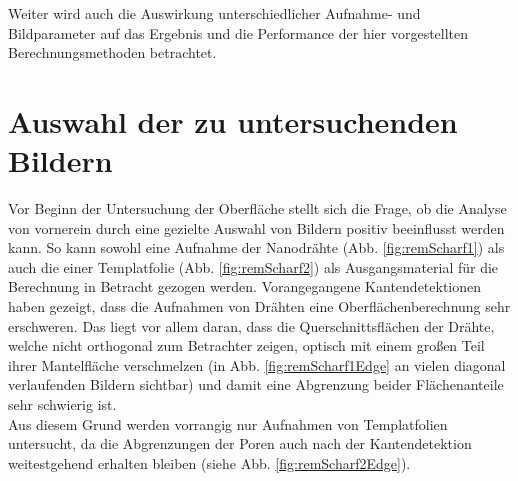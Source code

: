 \documentclass[accentcolor=tud1c, 11pt, toc=bib, toc=listof, captions=abovetable, parskip=half]{tudreport}
\begin{document}
Weiter wird auch die Auswirkung unterschiedlicher Aufnahme- und Bildparameter auf das Ergebnis und die Performance der hier vorgestellten Berechnungsmethoden betrachtet.

\section{Auswahl der zu untersuchenden Bildern}
Vor Beginn der Untersuchung der Oberfläche stellt sich die Frage, ob die Analyse von vornerein durch eine gezielte Auswahl von Bildern positiv beeinflusst werden kann. So kann sowohl eine Aufnahme der Nanodrähte (Abb. \ref{fig:remScharf1}) als auch die einer Templatfolie (Abb. \ref{fig:remScharf2}) als Ausgangsmaterial für die Berechnung in Betracht gezogen werden. Vorangegangene Kantendetektionen haben gezeigt, dass die Aufnahmen von Drähten eine Oberflächenberechnung sehr erschweren. Das liegt vor allem daran, dass die Querschnittsflächen der Drähte, welche nicht orthogonal zum Betrachter zeigen, optisch mit einem großen Teil ihrer Mantelfläche verschmelzen (in Abb. \ref{fig:remScharf1Edge} an vielen diagonal verlaufenden Bildern sichtbar) und damit eine Abgrenzung beider Flächenanteile sehr schwierig ist.\\

Aus diesem Grund werden vorrangig nur Aufnahmen von Templatfolien untersucht, da die Abgrenzungen der Poren auch nach der Kantendetektion weitestgehend erhalten bleiben (siehe Abb. \ref{fig:remScharf2Edge}).\\
\end{document}

